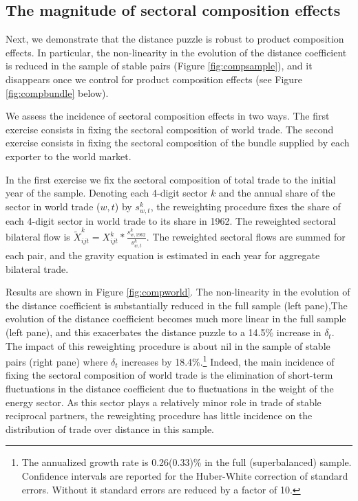 \documentclass[12pt,twoside,a4paper,notitlepage]{article}
\begin{document}
\subsection{The magnitude of sectoral composition effects} \label{subsec:robustpuzzle}
Next, we demonstrate that the distance puzzle is robust to product composition effects.
In particular, the non-linearity in the evolution of the distance coefficient  is reduced in the sample of stable pairs (Figure \ref{fig:compsample}), and it \fi disappears once we control for product composition effects (see Figure \ref{fig:compbundle} below).

We assess the incidence of sectoral composition effects in two ways.
The first exercise consists in fixing the sectoral composition of world trade.
The second exercise consists in fixing the sectoral composition of the bundle supplied by each exporter to the world market.


In the first exercise we fix the sectoral composition of total trade to the initial year of the sample.
Denoting each 4-digit sector $k$ and the annual share of the sector in world trade ($w,t$) by $s^{k}_{w,t}$, the reweighting procedure fixes the share of each 4-digit sector in world trade to its share in 1962.
The reweighted sectoral bilateral flow is $\tilde{X}^k_{ijt}=X^k_{ijt}*\frac{s^k_{w,1962}}{s^k_{w,t}}$.
The reweighted sectoral flows are summed for each pair, and the gravity equation is estimated in each year for aggregate bilateral trade.


Results are shown in Figure \ref{fig:compworld}.
 The non-linearity in the evolution of the distance coefficient is substantially reduced in the full sample (left pane),\fi The evolution of the distance coefficient becomes much more linear in the full sample (left pane), and this exacerbates the distance puzzle to a 14.5\% increase in $\delta_t$.
The impact of this reweighting procedure is about nil in the sample of stable pairs (right pane) where $\delta_t$ increases by 18.4\%.\footnote{The annualized growth rate is 0.26(0.33)\% in the full (superbalanced) sample.
Confidence intervals are reported for the Huber-White correction of standard errors.
Without it standard errors are reduced by a factor of 10.}
Indeed, the main incidence of fixing the sectoral composition of world trade is the elimination of short-term fluctuations in the distance coefficient due to fluctuations in the weight of the energy sector.
As this sector plays a relatively minor role in trade of stable reciprocal partners, the reweighting procedure has little incidence on the distribution of trade over distance in this sample.
\end{document}
